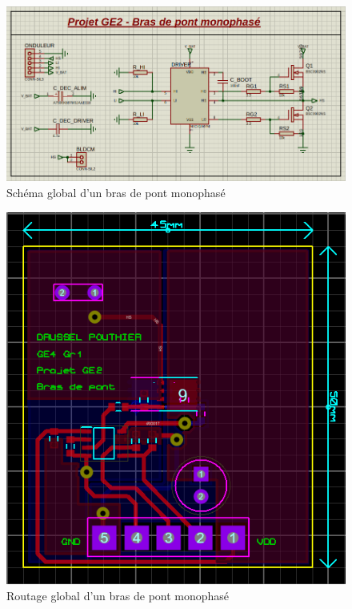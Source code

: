 		\begin{landscape}
		
		\begin{figure}
			\begin{center}
				\includegraphics[scale=0.7]{../Illus/phase_gen_scheme.png}
			\end{center}
			\caption{Schéma global d'un bras de pont monophasé}
			\label{phase_gen_scheme}
		\end{figure}
		
		\newpage

		\begin{figure}
			\begin{center}
				\includegraphics[scale=1]{../Illus/phase_gen_routing.png}
			\end{center}
			\caption{Routage global d'un bras de pont monophasé}
			\label{phase_gen_routing}
		\end{figure}
		

\end{landscape}
